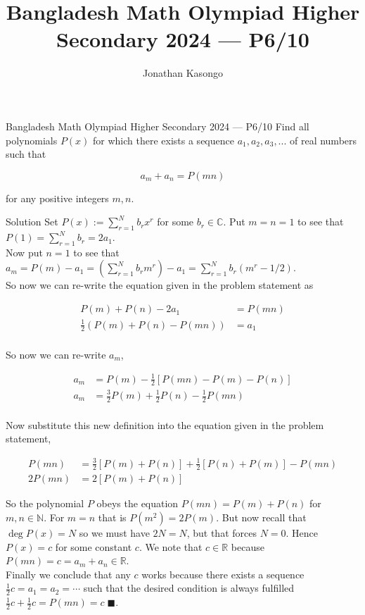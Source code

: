\documentclass{article}
\author{Jonathan Kasongo}
\title{Bangladesh Math Olympiad Higher Secondary 2024 --- P6/10 }
\begin{document}
\maketitle

\begin{problem}{Bangladesh Math Olympiad Higher Secondary 2024 --- P6/10 }
Find all polynomials $P(x)$ for which there exists a sequence
$a_1, a_2, a_3, ...$ of real numbers such that

$$
a_m + a_n = P(mn)
$$

for any positive integers $m,n$.
\end{problem}

\begin{solution}{Solution}
Set $P(x) := \sum_{r=1}^N b_r x^r$ for some $b_r \in \mathbb{C}$. Put
$m=n=1$ to see that $P(1) = \sum_{r=1}^N b_r = 2a_1$. \\

Now put $n=1$ to see
that $a_m = P(m) - a_1 = \left( \sum_{r=1}^N b_r m^r \right) - a_1 = \sum_{r=1}^N b_r (m^r - 1/2)$. \\

So now we can re-write the equation given in the problem statement as

\[
\begin{aligned}
P(m) + P(n) - 2a_1 &= P(mn)\\
\frac{1}{2}( P(m) + P(n) - P(mn) ) &= a_1\\
\end{aligned}
\]

So now we can re-write $a_m$,

\[
\begin{aligned}
a_m &= P(m) - \frac{1}{2} \left[ P(mn) - P(m) - P(n) \right]\\
a_m &= \frac{3}{2} P(m) + \frac{1}{2} P(n) - \frac{1}{2} P(mn)\\
\end{aligned}
\]

Now substitute this new definition into the equation given in the problem
statement,

\[
\begin{aligned}
P(mn) &= \frac{3}{2} \left[ P(m) + P(n) \right] +
\frac{1}{2} \left[ P(n) + P(m) \right] - P(mn)\\
2P(mn) &= 2\left[ P(m) + P(n) \right]
\end{aligned}
\]

So the polynomial $P$ obeys the equation $P(mn) = P(m)+P(n)$ for
$m,n \in \mathbb{N}$. For $m=n$ that is $P\left(m^2\right) = 2P(m)$.
But now recall that $\deg P(x) = N$ so we must have $2N = N$, but that
forces $N=0$. Hence $P(x) = c$ for some constant $c$. We note that
$c \in \mathbb{R}$ because $P(mn) = c = a_m + a_n \in \mathbb{R}$. \\

Finally we conclude that any $c$ works because there exists a sequence
$\frac{1}{2}c = a_1 = a_2 = \cdots$ such that the desired condition is
always fulfilled $\frac{1}{2}c + \frac{1}{2}c = P(mn) = c \; \blacksquare$.
\end{solution}
\newpage
\end{document}
